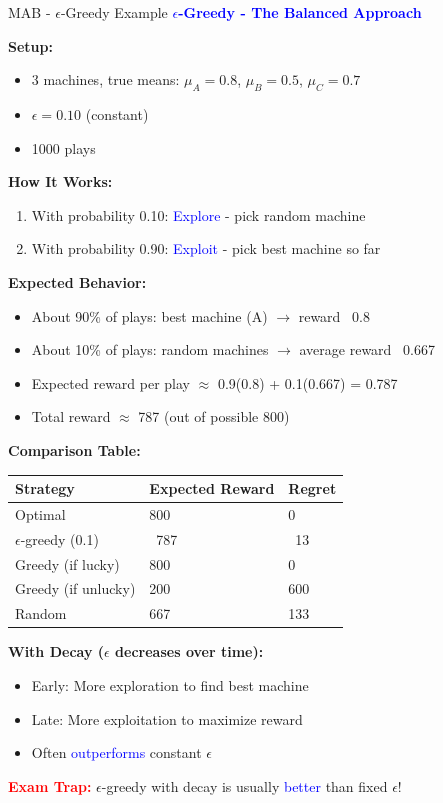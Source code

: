 \documentclass[8pt]{beamer}
\begin{document}
	\begin{frame}{MAB - $\epsilon$-Greedy Example}
		\fontsize{6.5}{7.5}\selectfont
		\textcolor{blue}{\textbf{$\epsilon$-Greedy - The Balanced Approach}}
		
		\textbf{Setup:}
		\begin{itemize}
			\item 3 machines, true means: $\mu_A = 0.8$, $\mu_B = 0.5$, $\mu_C = 0.7$
			\item $\epsilon = 0.10$ (constant)
			\item 1000 plays
		\end{itemize}
		
		\textbf{How It Works:}
		\begin{enumerate}
			\item With probability 0.10: \textcolor{blue}{Explore} - pick random machine
			\item With probability 0.90: \textcolor{blue}{Exploit} - pick best machine so far
		\end{enumerate}
		
		\textbf{Expected Behavior:}
		\begin{itemize}
			\item About 90\% of plays: best machine (A) $\rightarrow$ reward ~0.8
			\item About 10\% of plays: random machines $\rightarrow$ average reward ~0.667
			\item Expected reward per play $\approx$ 0.9(0.8) + 0.1(0.667) = 0.787
			\item Total reward $\approx$ 787 (out of possible 800)
		\end{itemize}
		
		\textbf{Comparison Table:}
		
		\begin{tabular}{|p{3cm}|p{3cm}|p{3cm}|}
			\hline
			\textbf{Strategy} & \textbf{Expected Reward} & \textbf{Regret} \\
			\hline
			Optimal & 800 & 0 \\
			\hline
			$\epsilon$-greedy (0.1) & ~787 & ~13 \\
			\hline
			Greedy (if lucky) & 800 & 0 \\
			\hline
			Greedy (if unlucky) & 200 & 600 \\
			\hline
			Random & 667 & 133 \\
			\hline
		\end{tabular}
		
		\textbf{With Decay ($\epsilon$ decreases over time):}
		\begin{itemize}
			\item Early: More exploration to find best machine
			\item Late: More exploitation to maximize reward
			\item Often \textcolor{blue}{outperforms} constant $\epsilon$
		\end{itemize}
		
		\textcolor{red}{\textbf{Exam Trap:}} $\epsilon$-greedy with decay is usually \textcolor{blue}{better} than fixed $\epsilon$!
	\end{frame}
	
\end{document}
